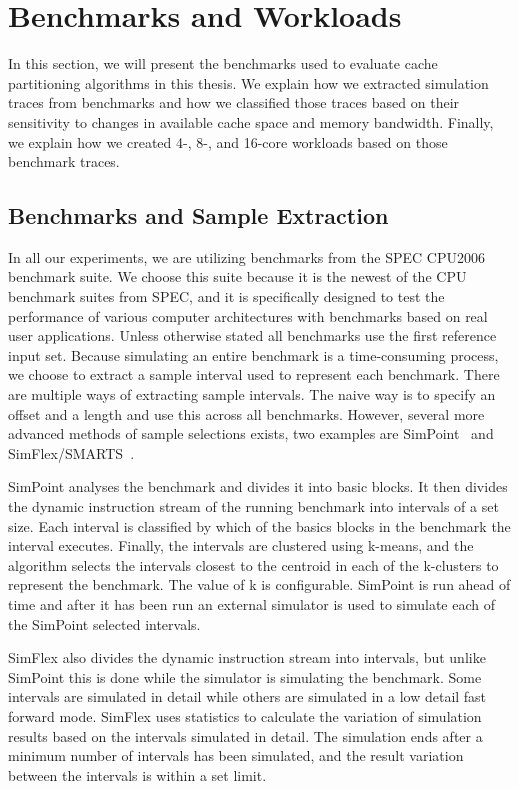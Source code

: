 
\section{Benchmarks and Workloads}
\label{sec:methodology:benchmarks}

In this section, we will present the benchmarks used to evaluate cache partitioning algorithms in this thesis.
We explain how we extracted simulation traces from benchmarks and how we classified those traces based on their sensitivity to changes in available cache space and memory bandwidth. 
Finally, we explain how we created 4-, 8-, and 16-core workloads based on those benchmark traces.

\subsection{Benchmarks and Sample Extraction}
\label{sec:methodology:benchmarks:benchmarks}

In all our experiments, we are utilizing benchmarks from the SPEC CPU2006~\cite{SPECCPU2006} benchmark suite. 
We choose this suite because it is the newest of the CPU benchmark suites from SPEC, and it is specifically designed to test the performance of various computer architectures with benchmarks based on real user applications.
Unless otherwise stated all benchmarks use the first reference input set.
Because simulating an entire benchmark is a time-consuming process, we choose to extract a sample interval used to represent each benchmark.
There are multiple ways of extracting sample intervals.
The naive way is to specify an offset and a length and use this across all benchmarks.
However, several more advanced methods of sample selections exists, two examples are SimPoint~\cite{Hamerly2005} and SimFlex/SMARTS~\cite{Hardavellas2004, Wunderlich2003}.

SimPoint analyses the benchmark and divides it into basic blocks.
It then divides the dynamic instruction stream of the running benchmark into intervals of a set size.
Each interval is classified by which of the basics blocks in the benchmark the interval executes.
Finally, the intervals are clustered using k-means, and the algorithm selects the intervals closest to the centroid in each of the k-clusters to represent the benchmark.
The value of k is configurable.
SimPoint is run ahead of time and after it has been run an external simulator is used to simulate each of the SimPoint selected intervals.

SimFlex also divides the dynamic instruction stream into intervals, but unlike SimPoint this is done while the simulator is simulating the benchmark.
Some intervals are simulated in detail while others are simulated in a low detail fast forward mode.
SimFlex uses statistics to calculate the variation of simulation results based on the intervals simulated in detail.
The simulation ends after a minimum number of intervals has been simulated, and the result variation between the intervals is within a set limit.

